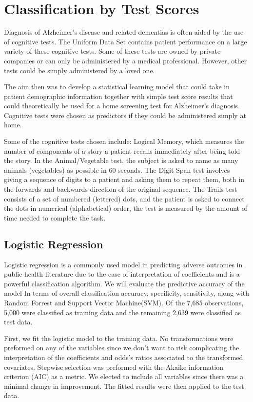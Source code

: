 \documentclass[a4paper,man,natbib,11pt]{article}
\begin{document}
\section{Classification by Test Scores}

Diagnosis of Alzheimer's disease and related dementias is often aided by the use of cognitive tests. The Uniform Data Set contains patient performance on a large variety of these cognitive tests. Some of these tests are owned by private companies or can only be administered by a medical professional. However, other tests could be simply administered by a loved one. 

The aim then was to develop a statistical learning model that could take in patient demographic information together with simple test score results that could theoretically be used for a home screening test for Alzheimer's diagnosis. Cognitive tests were chosen as predictors if they could be administered simply at home. 

Some of the cognitive tests chosen include: Logical Memory, which measures the number of components of a story a patient recalls immediately after being told the story. In the Animal/Vegetable test, the subject is asked to name as many animals (vegetables) as possible in 60 seconds. The Digit Span test involves giving a sequence of digits to a patient and asking them to repeat them, both in the forwards and backwards direction of the original sequence. The Trails test consists of a set of numbered (lettered) dots, and the patient is asked to connect the dots in numerical (alphabetical) order, the test is measured by the amount of time needed to complete the task.

\subsection{Logistic Regression}
Logistic regression is a commonly used model in predicting adverse outcomes in public health literature due to the ease of interpretation of coefficients and is a powerful classification algorithm. We will evaluate the predictive accuracy of the model In terms of overall classification accuracy, specificity, sensitivity, along with Random Forrest and Support Vector Machine(SVM). Of the 7,685 observations,  5,000 were classified as training data and the remaining 2,639 were classified as test data. 

First, we fit the logistic model to the training data. No transformations were preformed on any of the variables since we don't want to risk complicating the interpretation of the coefficients and odds's ratios associated to the transformed covariates. Stepwise selection was preformed with the Akaike information criterion (AIC) as a metric. We elected to include all variables since there was a minimal change in improvement. The fitted results were then applied to the test data. 
\end{document}
